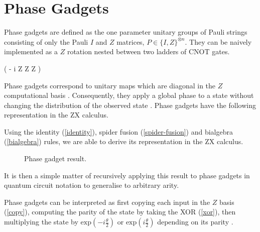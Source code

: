 \section{Phase Gadgets}%
\label{phase-gadgets}

Phase gadgets are defined as the one parameter unitary groups of Pauli strings consisting of only the Pauli $I$ and $Z$ matrices, $P \in \{I, Z\}^{\otimes n}$. They can be naively implemented as a $Z$ rotation nested between two ladders of CNOT gates.

{ \left( - i  Z \otimes Z \otimes Z \right)}

Phase gadgets correspond to unitary maps which are diagonal in the $Z$ computational basis \cite{Cowtan2020}. Consequently, they apply a global phase to a state without changing the distribution of the observed state \cite{Yeung2020}. Phase gadgets have the following representation in the ZX calculus.


Using the identity (\ref{identity}), spider fusion (\ref{spider-fusion}) and bialgebra (\ref{bialgebra}) rules, we are able to derive its representation in the ZX calculus.

\begin{figure}[H]
    \centering
    \caption{Phase gadget result.}
    \label{phase-gadget-result}
\end{figure}

It is then a simple matter of recursively applying this result to phase gadgets in quantum circuit notation to generalise to arbitrary arity.

%

Phase gadgets can be interpreted as first copying each input in the $Z$ basis (\ref{copy}), computing the parity of the state by taking the XOR (\ref{xor}), then multiplying the state by $\text{exp} \left(-i\frac{\theta}{2} \right)$ or $\text{exp} \left(i\frac{\theta}{2} \right)$ depending on its parity \cite{Yeung2020}. 

